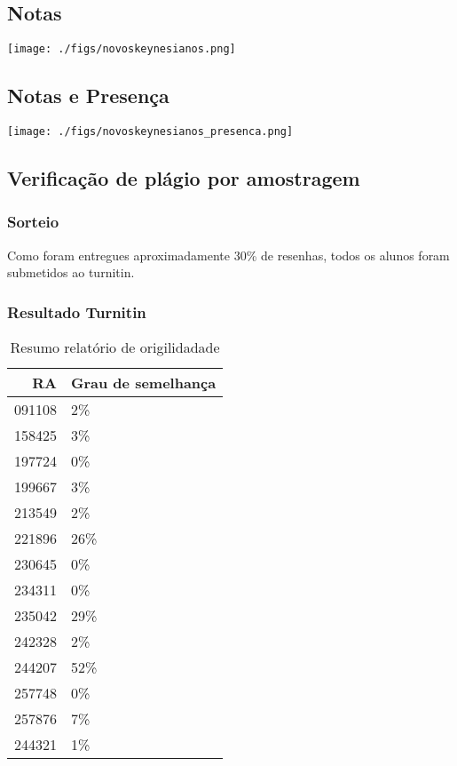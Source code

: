 \documentclass[11pt]{article}
\begin{document}
\subsection{Notas}
\label{sec:org776832c}
\begin{center}
\texttt{[image: ./figs/novoskeynesianos.png]}
\end{center}



\subsection{Notas e Presença}
\label{sec:org8470d1f}
\begin{center}
\texttt{[image: ./figs/novoskeynesianos\_presenca.png]}
\end{center}
\subsection{Verificação de plágio por amostragem}
\label{sec:org37180a9}
\subsubsection{Sorteio}
\label{sec:orgacb0c1d}

Como foram entregues aproximadamente 30\% de resenhas, todos os alunos foram submetidos ao turnitin.

\subsubsection{Resultado Turnitin}
\label{sec:org1a77174}

\begin{table}[htbp]
\caption{\label{TurnitinNvK}Resumo relatório de origilidadade}
\centering
\begin{tabular}{rl}
\hline
RA & Grau de semelhança\\
\hline
091108 & 2\%\\
158425 & 3\%\\
197724 & 0\%\\
199667 & 3\%\\
213549 & 2\%\\
221896 & 26\%\\
230645 & 0\%\\
234311 & 0\%\\
235042 & 29\%\\
242328 & 2\%\\
244207 & 52\%\\
257748 & 0\%\\
257876 & 7\%\\
244321 & 1\%\\
\hline
\end{tabular}
\end{table}
\end{document}
